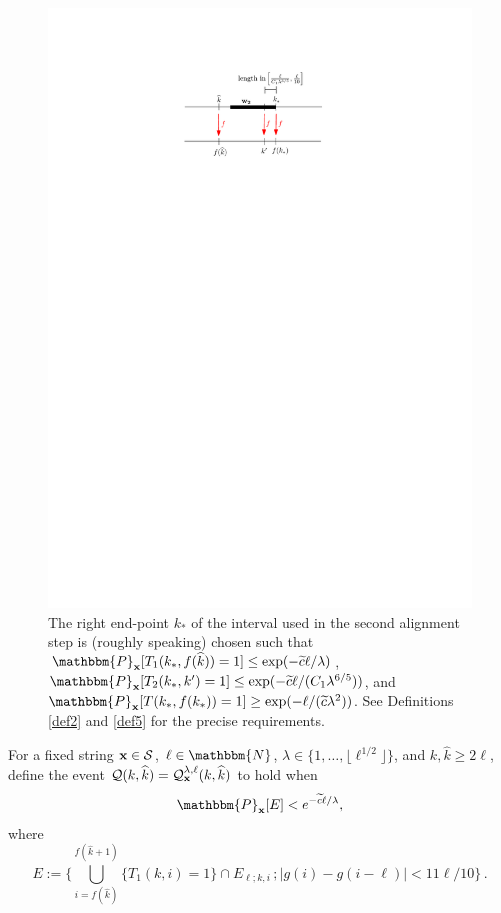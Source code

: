 \documentclass[final,12pt]{colt2018} %
\newcommand{\N}{\mathbbm{N}}
\renewcommand{\P}{\mathbbm{P}}
\newcommand{\1}{\mathbf{1}}
\newcommand{\wt}{\widetilde}
\newcommand{\wh}{\widehat}
\newcommand{\mcl}{\mathcal}
\def\x{{\bf x}}
\def\ct{{\wt c}}
\def\Rhat{{\mathcal Q}}
\begin{document}
\begin{figure}[b]
	\centering
	\includegraphics[scale=1]{findkstar}
	\caption{The right end-point $k_*$ of the interval used
		in the second alignment step is (roughly speaking) chosen such that
		$\P_{\bf x}[ T_1(k_*,f(\wh k))=1 ]\leq \exp(-\ct\ell/\lambda)$,
		$\P_{\bf x}[ T_2(k_*,k')=1 ]\leq \exp(-\ct\ell/(C_1 \lambda^{6/5}) )$,
		and $\P_{\bf x}[ T(k_*,f(k_*))=1 ]\geq \exp(-\ell/(\ct\lambda^2))$.
		See Definitions \ref{def2} and \ref{def5} for the precise requirements.}
	\label{fig:k_*}
\end{figure}

\begin{definition}
	For a fixed string $\x\in\mcl S$, $\ell\in\N$, $\lambda \in
	\{ 1,\dots,\lfloor \ell^{1/2}\rfloor \}$, and $k , \wh k \geq 2 \ell$,
	define the event $\Rhat (k,\wh k)=\Rhat_\x^{\lambda,\ell}(k,\wh k)$ to
	hold when
	$$\P_{\bf x} [E] < e^{- \ct \ell / \lambda},$$
	where
	$$E := \Bigg \{ \bigcup_{i=f(\wh k)}^{f(\wh k+1)}
	\{ T_1(k,i)=1 \} \cap E_{\ell; k, i} \, ;
	|g(i) - g(i - \ell)| < 11 \ell / 10  \Bigg \} \, . $$
	\label{def2}
\end{definition}
\end{document}
